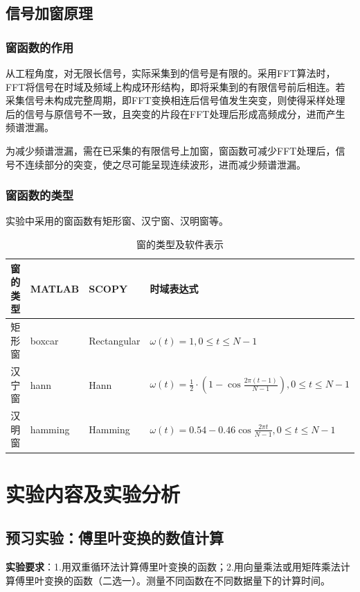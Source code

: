 \documentclass[12pt]{article}
\begin{document}


\subsection{信号加窗原理}
\subsubsection{窗函数的作用}
从工程角度，对无限长信号，实际采集到的信号是有限的。采用FFT算法时，FFT将信号在时域及频域上构成环形结构，即将采集到的有限信号前后相连。若采集信号未构成完整周期，即FFT变换相连后信号值发生突变，则使得采样处理后的信号与原信号不一致，且突变的片段在FFT处理后形成高频成分，进而产生频谱泄漏。

为减少频谱泄漏，需在已采集的有限信号上加窗，窗函数可减少FFT处理后，信号不连续部分的突变，使之尽可能呈现连续波形，进而减少频谱泄漏。

\subsubsection{窗函数的类型}
实验中采用的窗函数有矩形窗、汉宁窗、汉明窗等。
\begin{table}[H]
		\setlength{\abovecaptionskip}{0cm} 
		\setlength{\belowcaptionskip}{0.2cm}
    \centering
        \caption{窗的类型及软件表示}
    \begin{tabular}{clll}
    \toprule[1.2pt]
        窗的类型 & MATLAB & SCOPY & 时域表达式\\
        \midrule
       矩形窗  & boxcar\(\)&Rectangular & $\omega(t)=1, 0\le t\le N-1 $\\
        汉宁窗 & hann\(\)& Hann & $\omega(t)=\frac{1}{2}\cdot (1-\cos{\frac{2\pi (t-1)}{N-1}}), 0\le t\le N-1 $\\
        汉明窗 &hamming\(\) & Hamming & $\omega(t)=0.54 - 0.46\cos{\frac{2\pi t}{N-1}}, 0\le t\le N-1 $\\
         \bottomrule[1.2pt]
    \end{tabular}
    \label{window}
\end{table}




\section{实验内容及实验分析}
\setcounter{subsection}{-1}
\subsection{预习实验：傅里叶变换的数值计算}
\textbf{实验要求}：1.用双重循环法计算傅里叶变换的函数；2.用向量乘法或用矩阵乘法计算傅里叶变换的函数（二选一）。测量不同函数在不同数据量下的计算时间。
\end{document}
